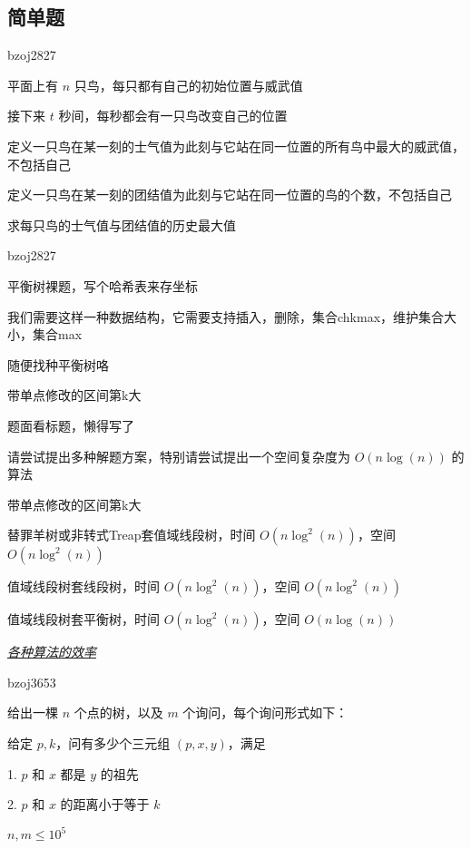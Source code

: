 \documentclass[UTF8]{beamer}
\begin{document}
		\subsection{简单题}

			\begin{frame}{bzoj2827}

			平面上有 $n$ 只鸟，每只都有自己的初始位置与威武值

			接下来 $t$ 秒间，每秒都会有一只鸟改变自己的位置

			定义一只鸟在某一刻的士气值为此刻与它站在同一位置的所有鸟中最大的威武值，不包括自己

			定义一只鸟在某一刻的团结值为此刻与它站在同一位置的鸟的个数，不包括自己

			求每只鸟的士气值与团结值的历史最大值

			\end{frame}

			\begin{frame}{bzoj2827}

			平衡树裸题，写个哈希表来存坐标

			我们需要这样一种数据结构，它需要支持插入，删除，集合chkmax，维护集合大小，集合max

			随便找种平衡树咯

			\end{frame}

			\begin{frame}{带单点修改的区间第k大}

			题面看标题，懒得写了

			请尝试提出多种解题方案，特别请尝试提出一个空间复杂度为 $O(n\log(n))$ 的算法

			\end{frame}

			\begin{frame}{带单点修改的区间第k大}

			替罪羊树或非转式Treap套值域线段树，时间 $O(n\log^2(n))$，空间 $O(n\log^2(n))$

			值域线段树套线段树，时间 $O(n\log^2(n))$，空间 $O(n\log^2(n))$
                        
			值域线段树套平衡树，时间 $O(n\log^2(n))$，空间 $O(n\log(n))$

			\href{http://vfleaking.blog.163.com/blog/static/1748076342013123659818/}{\emph{\underline{各种算法的效率}}}

			\end{frame}

			\begin{frame}{bzoj3653}

			给出一棵 $n$ 个点的树，以及 $m$ 个询问，每个询问形式如下：

			给定 $p,k$，问有多少个三元组 $(p,x,y)$，满足

			1. $p$ 和 $x$ 都是 $y$ 的祖先

			2. $p$ 和 $x$ 的距离小于等于 $k$

			$n,m \le 10^5$

			\end{frame}
\end{document}
